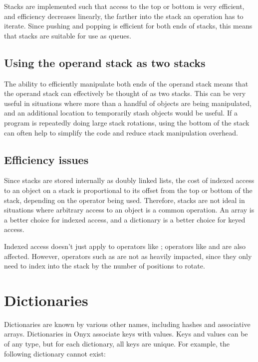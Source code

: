 Stacks are implemented such that access to the top or bottom is very efficient,
and efficiency decreases linearly, the farther into the stack an operation has
to iterate.  Since pushing and popping is efficient for both ends of stacks,
this means that stacks are suitable for use as queues.

\subsection{Using the operand stack as two stacks}

The ability to efficiently manipulate both ends of the operand stack means that
the operand stack can effectively be thought of as two stacks.  This can be very
useful in situations where more than a handful of objects are being manipulated,
and an additional location to temporarily stash objects would be useful.  If a
program is repeatedly doing large stack rotations, using the bottom of the stack
can often help to simplify the code and reduce stack manipulation overhead.

\subsection{Efficiency issues}

Since stacks are stored internally as doubly linked lists, the cost of indexed
access to an object on a stack is proportional to its offset from the top or
bottom of the stack, depending on the operator being used.  Therefore, stacks
are not ideal in situations where arbitrary access to an object is a common
operation.  An array is a better choice for indexed access, and a dictionary is
a better choice for keyed access.

Indexed access doesn't just apply to operators like
; operators like
 and
 are also affected.  However,
operators such as  are not as heavily
impacted, since they only need to index into the stack by the number of
positions to rotate.

\section{Dictionaries}

Dictionaries are known by various other names, including hashes and associative
arrays.  Dictionaries in Onyx associate keys with values.  Keys and values can
be of any type, but for each dictionary, all keys are unique.  For example, the
following dictionary cannot exist:

